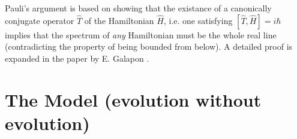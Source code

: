 \documentclass[a0,portrait]{a0poster}
\begin{document}
\begin{multicols}{2}
Pauli's argument
is based on showing that
the existance of
a canonically conjugate operator $\hat{T}$ of the Hamiltonian $\hat{H}$,
i.e. one satisfying
$
  \label{THcommutator}
  [\hat{T}, \hat{H}] = i\hbar
$
implies that the spectrum of \emph{any} Hamiltonian must be the whole real line
(contradicting the property of being bounded from below).
A detailed proof is expanded in the paper by E. Galapon \cite{Galapon2002}.






\color{DarkSlateGray} %

\section*{The Model (evolution without evolution)}


\end{multicols}
\end{document}
